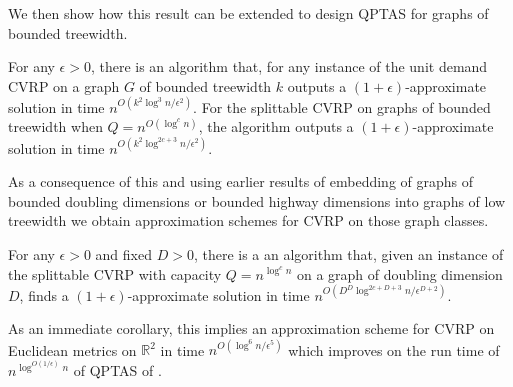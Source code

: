 \documentclass[twoside,leqno]{article}
\newcommand{\eps}{\epsilon}
\begin{document}


We then show how this result can be extended to design QPTAS for graphs of bounded treewidth.

\begin{theorem}\label{thm:treewidth}
For any $\eps > 0$, there is an algorithm that, for any instance of the unit demand CVRP on a graph $G$ of bounded treewidth $k$ outputs a $(1+\eps)$-approximate solution in time 
$n^{O(k^2\log^3 n/\eps^2)}$. For the splittable CVRP on graphs of bounded treewidth when $Q = n^{O(\log^c n)}$, 
the algorithm outputs a $(1 + \eps)$-approximate solution in time $n^{O(k^2\log^{2c + 3} n/\eps^2)}$.
\end{theorem}



As a consequence of this and using earlier results of embedding of graphs of bounded doubling dimensions or bounded highway dimensions into graphs of low treewidth we obtain approximation schemes for CVRP on those graph classes.

\begin{theorem}\label{thm:DD}
For any $\eps > 0$ and fixed $D > 0$, there is a an algorithm that, given an instance of the splittable CVRP with 
capacity $Q = n^{\log^c n}$ on a graph of doubling dimension $D$, finds a $(1 + \eps)$-approximate solution in time $n^{O(D^D \log^{2c + D + 3}n/\eps^{D+2})}$.
\end{theorem}

As an immediate corollary, this implies an approximation scheme for CVRP on Euclidean metrics on $\mathbb{R}^2$ in time $n^{O(\log^{6}n/\eps^{5})}$
which improves on the run time of $n^{\log^{O(1/\epsilon)}n}$ of QPTAS of \cite{Das-Mathieu}. 
\end{document}
